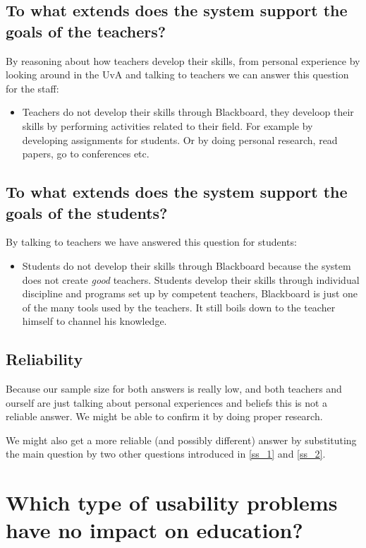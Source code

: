 \subsection{To what extends does the system support the goals of the teachers?}
By reasoning about how teachers develop their skills, from personal experience by looking around in the UvA and talking to teachers we can answer this question for the staff:
\begin{itemize}
	\item Teachers do not develop their skills through Blackboard, they develoop their skills by performing activities related to their field. For example by developing assignments for students. Or by doing personal research, read papers, go to conferences etc.
\end{itemize}

\subsection{To what extends does the system support the goals of the students?}

By talking to teachers we have answered this question for students:
\begin{itemize}
	\item Students do not develop their skills through Blackboard because the system does not create \emph{good} teachers. Students develop their skills through individual discipline and programs set up by competent teachers, Blackboard is just one of the many tools used by the teachers. It still boils down to the teacher himself to channel his knowledge.
\end{itemize}

\subsection{Reliability}
Because our sample size for both answers is really low, and both teachers and ourself are just talking about personal experiences and beliefs this is not a reliable answer. We might be able to confirm it by doing proper research.

We might also get a more reliable (and possibly different) answer by substituting the main question by two other questions introduced in \ref{ss_1} and \ref{ss_2}.


\section{Which type of usability problems have no impact on education?}
\label{s_1}

